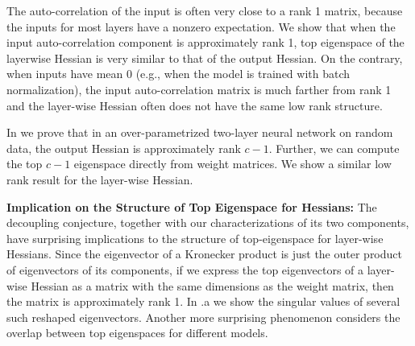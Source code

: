The auto-correlation of the input is often very close to a rank 1 matrix, because the inputs for most layers have a nonzero expectation. We show that when the input auto-correlation component is approximately rank 1, top eigenspace of the layerwise Hessian is very similar to that of the output Hessian. %
On the contrary, when inputs have mean 0 (e.g., when the model is trained with batch normalization), the input auto-correlation matrix is much farther from rank 1 and the layer-wise Hessian often does not have the same low rank structure.

In  we prove that in an over-parametrized two-layer neural network on random data, the output Hessian is approximately rank $c-1$. Further, we can compute the top $c-1$ eigenspace directly from weight matrices. We show a similar low rank result for %
the layer-wise Hessian. %



\textbf{Implication on the Structure of Top Eigenspace for Hessians:} The decoupling conjecture, together with our characterizations of its two components, have surprising implications to the structure of top-eigenspace for layer-wise Hessians. Since the eigenvector of a Kronecker product is just the outer product of eigenvectors of its components, if we express the top eigenvectors of a layer-wise Hessian as a matrix with the same dimensions as the weight matrix, then the matrix is approximately rank 1. In .a we show the singular values of several such reshaped eigenvectors. Another more surprising phenomenon considers the overlap between top eigenspaces for different models.

